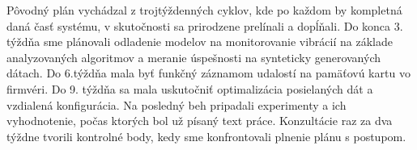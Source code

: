 Pôvodný plán vychádzal z trojtýždenných cyklov, kde po každom by kompletná daná časť systému, v skutočnosti sa
prirodzene prelínali a dopĺňali. Do konca 3. týždňa sme plánovali odladenie modelov na monitorovanie vibrácií na základe
analyzovaných algoritmov a meranie úspešnosti na synteticky generovaných dátach. Do 6.týždňa mala byť funkčný
záznamom udalostí na pamäťovú kartu vo firmvéri. Do 9. týždňa sa mala uskutočniť optimalizácia posielaných dát
a vzdialená konfigurácia. Na posledný beh pripadali experimenty a ich vyhodnotenie, počas ktorých bol už písaný text práce.
Konzultácie raz za dva týždne tvorili kontrolné body, kedy sme konfrontovali plnenie plánu s postupom.
\clearpage
